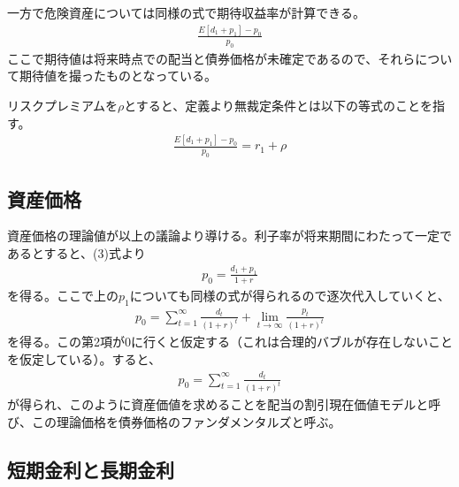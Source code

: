 \documentclass{jsarticle}
\begin{document}
一方で危険資産については同様の式で期待収益率が計算できる。
\begin{align}
	\frac{E[d_1 + p_1] -p_0}{p_0}
\end{align}
ここで期待値は将来時点での配当と債券価格が未確定であるので、それらについて期待値を撮ったものとなっている。

リスクプレミアムを$\rho$とすると、定義より無裁定条件とは以下の等式のことを指す。
\begin{align}
	\frac{E[d_1 + p_1] -p_0}{p_0} = r_1 + \rho
\end{align}

\subsection{資産価格}
資産価格の理論値が以上の議論より導ける。利子率が将来期間にわたって一定であるとすると、(3)式より
\begin{align}
	p_0 = \frac{d_1 + p_1}{1 + r}
\end{align}
を得る。ここで上の$p_1$についても同様の式が得られるので逐次代入していくと、
\begin{align*}
	p_0 = \sum_{t = 1}^{\infty} \frac{d_t}{(1+ r)^t} + \lim_{t \to \infty} \frac{p_t}{(1 + r)^t}
\end{align*}
を得る。この第2項が0に行くと仮定する（これは合理的バブルが存在しないことを仮定している）。すると、
\begin{align}
	p_0 = \sum_{t = 1}^{\infty} \frac{d_t}{(1+ r)^t}
\end{align}
が得られ、このように資産価値を求めることを配当の割引現在価値モデルと呼び、この理論価格を債券価格のファンダメンタルズと呼ぶ。

\subsection{短期金利と長期金利}
\end{document}
